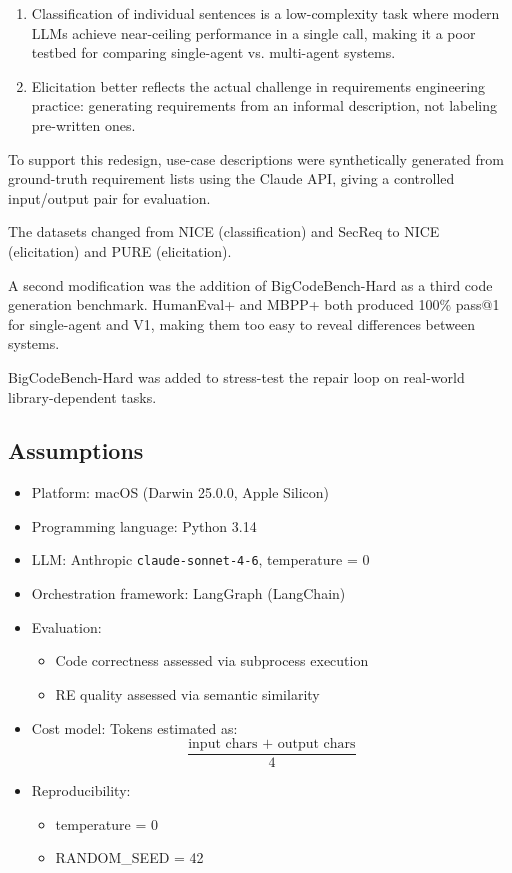 \documentclass[11pt]{article}
\begin{document}
\begin{enumerate}
    \item Classification of individual sentences is a low-complexity task where modern LLMs achieve near-ceiling performance in a single call, making it a poor testbed for comparing single-agent vs. multi-agent systems.
    
    \item Elicitation better reflects the actual challenge in requirements engineering practice: generating requirements from an informal description, not labeling pre-written ones.
\end{enumerate}

To support this redesign, use-case descriptions were synthetically generated from ground-truth requirement lists using the Claude API, giving a controlled input/output pair for evaluation.

The datasets changed from NICE (classification) and SecReq to NICE (elicitation) and PURE (elicitation).

A second modification was the addition of BigCodeBench-Hard as a third code generation benchmark. HumanEval+ and MBPP+ both produced 100\% pass@1 for single-agent and V1, making them too easy to reveal differences between systems.

BigCodeBench-Hard was added to stress-test the repair loop on real-world library-dependent tasks.

\subsection{Assumptions}

\begin{itemize}
    \item Platform: macOS (Darwin 25.0.0, Apple Silicon)
    \item Programming language: Python 3.14
    \item LLM: Anthropic \texttt{claude-sonnet-4-6}, temperature = 0
    \item Orchestration framework: LangGraph (LangChain)
    \item Evaluation:
    \begin{itemize}
        \item Code correctness assessed via subprocess execution
        \item RE quality assessed via semantic similarity
    \end{itemize}
    \item Cost model: Tokens estimated as:
\[
\frac{\text{input chars + output chars}}{4}
\]
    \item Reproducibility:
    \begin{itemize}
        \item temperature = 0
        \item RANDOM\_SEED = 42
    \end{itemize}
\end{itemize}
\end{document}
